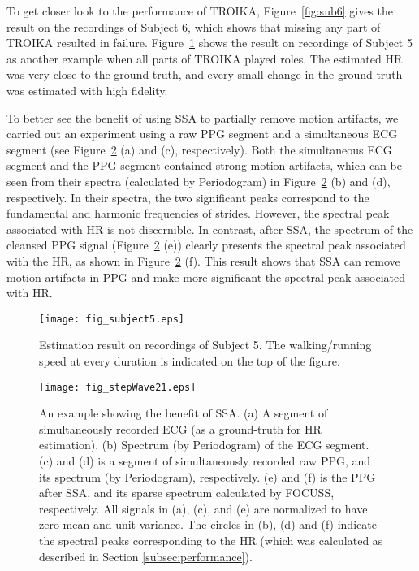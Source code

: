 \documentclass[10pt,twocolumn]{IEEEtran}
\begin{document}
To get closer look to the performance of TROIKA, Figure~\ref{fig:sub6} gives the result on the recordings of Subject 6, which shows that missing any part of TROIKA resulted in failure. Figure~\ref{fig:sub5} shows the result on recordings of Subject 5 as another example when all parts of TROIKA played roles. The estimated HR was very close to the ground-truth, and every small change in the ground-truth was estimated with high fidelity.

To better see the benefit of using SSA to partially remove motion artifacts,  we carried out an experiment using a raw PPG segment and a simultaneous ECG segment (see Figure~\ref{fig:stepResult} (a) and (c), respectively). Both the simultaneous ECG segment and the PPG segment contained strong motion artifacts, which can be seen from their spectra (calculated by Periodogram) in Figure~\ref{fig:stepResult} (b) and (d), respectively. In their spectra, the two significant peaks correspond to the fundamental and harmonic frequencies of strides. However, the spectral peak associated with HR is not discernible. In contrast, after SSA, the spectrum of the cleansed PPG signal (Figure~\ref{fig:stepResult} (e)) clearly presents the spectral peak associated with the HR, as shown in Figure~\ref{fig:stepResult} (f). This result shows that SSA can remove motion artifacts in PPG and make more significant the spectral peak associated with HR.





\begin{figure}[t]
\centering
\texttt{[image: fig\_subject5.eps]}
\caption{Estimation result on recordings of Subject 5. The walking/running speed at every duration is indicated on the top of the figure.  }
\label{fig:sub5}
\end{figure}




\begin{figure}[t]
\centering
\texttt{[image: fig\_stepWave21.eps]}
\caption{An example showing the benefit of SSA. (a) A segment of simultaneously recorded ECG (as a ground-truth for HR estimation). (b) Spectrum (by Periodogram) of the ECG segment. (c) and (d) is a segment of simultaneously recorded raw PPG, and its spectrum (by Periodogram), respectively. (e) and (f) is the PPG after SSA, and its sparse spectrum calculated by FOCUSS, respectively. All signals in (a), (c), and (e) are normalized to have zero mean and unit variance. The circles in (b), (d) and (f) indicate the spectral peaks corresponding to the HR (which was  calculated as described in Section \ref{subsec:performance}). }
\label{fig:stepResult}
\end{figure}
\end{document}
